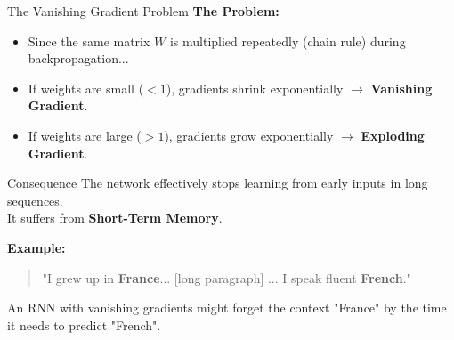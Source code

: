 \documentclass[aspectratio=169]{beamer}
\begin{document}



\begin{frame}{The Vanishing Gradient Problem}
		\textbf{The Problem:}
	\begin{itemize}
		\item Since the same matrix $W$ is multiplied repeatedly (chain rule) during backpropagation...
		\item If weights are small ($<1$), gradients shrink exponentially $\rightarrow$ \textbf{Vanishing Gradient}.
		\item If weights are large ($>1$), gradients grow exponentially $\rightarrow$ \textbf{Exploding Gradient}.
	\end{itemize}
	\begin{alertblock}{Consequence}
		The network effectively stops learning from early inputs in long sequences. \\ It suffers from \textbf{Short-Term Memory}.
	\end{alertblock}
	\textbf{Example:}
	\begin{quote}
		"I grew up in \textbf{France}... [long paragraph] ... I speak fluent \textbf{French}."
	\end{quote}
	
	An RNN with vanishing gradients might forget the context "France" by the time it needs to predict "French".
\end{frame}
\end{document}
